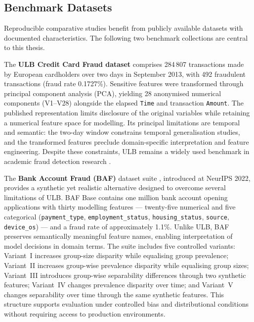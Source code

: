 \subsection{Benchmark Datasets}
\label{subsec:sota-datasets}

Reproducible comparative studies benefit from publicly available datasets with documented characteristics. The following two benchmark collections are central to this thesis.

The \textbf{ULB Credit Card Fraud dataset} \cite{dalpozzolo2017realistic,ulb2013dataset} comprises 284\,807 transactions made by European cardholders over two days in September 2013, with 492 fraudulent transactions (fraud rate 0.1727\%). Sensitive features were transformed through principal component analysis (PCA), yielding 28 anonymised numerical components (V1--V28) alongside the elapsed \texttt{Time} and transaction \texttt{Amount}. The published representation limits disclosure of the original variables while retaining a numerical feature space for modelling. Its principal limitations are temporal and semantic: the two-day window constrains temporal generalisation studies, and the transformed features preclude domain-specific interpretation and feature engineering. Despite these constraints, ULB remains a widely used benchmark in academic fraud detection research \cite{ali2022financial, mienye2024deep}.

The \textbf{Bank Account Fraud (BAF)} dataset suite \cite{jesus2022turning,feedzai2022bafdataset}, introduced at NeurIPS 2022, provides a synthetic yet realistic alternative designed to overcome several limitations of ULB. BAF Base contains one million bank account opening applications with thirty modelling features — twenty-five numerical and five categorical (\texttt{payment\_type}, \texttt{employment\_status}, \texttt{housing\_status}, \texttt{source}, \texttt{device\_os}) — and a fraud rate of approximately 1.1\%. Unlike ULB, BAF preserves semantically meaningful feature names, enabling interpretation of model decisions in domain terms. The suite includes five controlled variants: Variant~I increases group-size disparity while equalising group prevalence; Variant~II increases group-wise prevalence disparity while equalising group sizes; Variant~III introduces group-wise separability differences through two synthetic features; Variant~IV changes prevalence disparity over time; and Variant~V changes separability over time through the same synthetic features. This structure supports evaluation under controlled bias and distributional conditions without requiring access to production environments.

